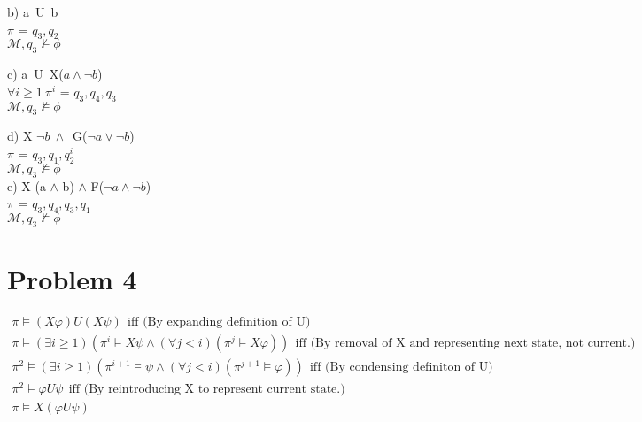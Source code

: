 \documentclass{article}
\begin{document}
b) a\ U\ b\\
$\pi$ = $q_3,q_2$\\
$\mathcal{M}, q_3 \nvDash \phi$ 

c) a\ U\ X($a \land \neg b$)\\
$\forall i \geq	 1\ \pi^i$ = $q_3,q_4,q_3$\\
$\mathcal{M}, q_3 \nvDash \phi$ 

d) X $\neg b\ \land$\ G($\neg a \lor \neg b$)\\
$\pi$ = $q_3,q_1,q_2^i$\\
$\mathcal{M}, q_3 \nvDash \phi$ \\

e) X (a $\land$ b) $\land$ F($\neg a \land \neg b$) \\
$\pi$ = $q_3,q_4,q_3,q_1$\\
$\mathcal{M}, q_3 \nvDash \phi$ 

\section{Problem 4}
\begin{align*}
	\pi \vDash (X \varphi) U (X \psi) \ \ \text{iff (By expanding definition of U)}\\
	\pi \vDash (\exists i \geq 1) (\pi^i \vDash X\psi \land (\forall j < i) (\pi^j \vDash X\varphi)) \ \ \text{iff (By removal of X and representing next state, not current.)}\\
	\pi^2 \vDash (\exists i \geq 1) (\pi^{i+1} \vDash \psi \land (\forall j < i) (\pi^{j+1} \vDash \varphi)) \ \ \text{iff (By condensing definiton of U)}\\
	\pi^2 \vDash \varphi U \psi \ \ \text{iff (By reintroducing X to represent current state.)}\\
	\pi \vDash X (\varphi U \psi)\\
\end{align*}
\end{document}
